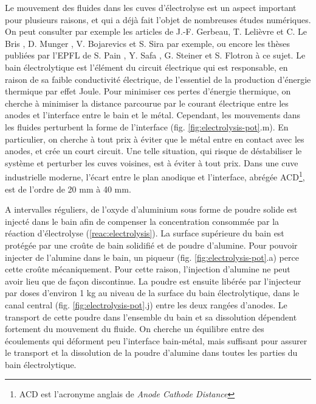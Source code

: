 Le mouvement des fluides dans les cuves d'électrolyse est un aspect
important pour plusieurs raisons, et qui a déjà fait l'objet de
nombreuses études numériques. On peut consulter par exemple les
articles de J.-F. Gerbeau, T. Lelièvre et C. Le Bris
\cite{Gerbeau2003}, D. Munger \cite{Munger2004}, V. Bojarevics et S. Sira
\cite{Bojarevics2015} par exemple, ou encore les
thèses publiées par l'EPFL de
S. Pain \cite{Pain2006}, Y. Safa \cite{Safa2009}, G. Steiner
\cite{Steiner2009} et S. Flotron \cite{Flotron2013} à ce sujet. Le bain
électrolytique est l'élément du circuit électrique qui est
responsable, en raison de sa faible conductivité électrique, de
l'essentiel de la production d'énergie thermique par effet
Joule. Pour minimiser ces pertes d'énergie thermique, on cherche à
minimiser la distance parcourue par le courant électrique entre les
anodes et l'interface entre le bain et le métal. Cependant, les
mouvements dans les fluides perturbent la forme de l'interface (fig. \ref{fig:electrolysis-pot}.m). En
particulier, on cherche à tout prix à éviter que le métal entre en
contact avec les anodes, et crée un court circuit. Une telle
situation, qui risque de déstabiliser le système et perturber les
cuves voisines, est à éviter à tout prix. Dans une cuve industrielle
moderne, l'écart entre le plan anodique et l'interface, abrégée
ACD\footnote{ACD est l'acronyme anglais de {\em Anode Cathode
    Distance}}, est de l'ordre de \num{20} \si{\milli\meter} à
\num{40} \si{\milli\meter}.

A intervalles réguliers, de l'oxyde d'aluminium sous forme de poudre
solide est injecté dans le bain afin de compenser la concentration
consommée par la réaction d'électrolyse (\ref{reac:electrolysis}).  La
surface supérieure du bain est protégée par une croûte de bain
solidifié et de poudre d'alumine. Pour pouvoir injecter de l'alumine
dans le bain, un piqueur (fig. \ref{fig:electrolysis-pot}.a) perce
cette croûte mécaniquement. Pour cette raison, l'injection d'alumine
ne peut avoir lieu que de façon discontinue.  La poudre est ensuite
libérée par l'injecteur par doses d'environ \num{1} \si{\kilo\gram} au
niveau de la surface du bain électrolytique, dans le canal central
(fig. \ref{fig:electrolysis-pot}.j) entre les deux rangées
d'anodes. Le transport de cette poudre dans l'ensemble du bain et sa
dissolution dépendent fortement du mouvement du fluide. On cherche un
équilibre entre des écoulements qui déforment peu l'interface
bain-métal, mais suffisant pour assurer le transport et la dissolution
de la poudre d'alumine dans toutes les parties du bain électrolytique.

